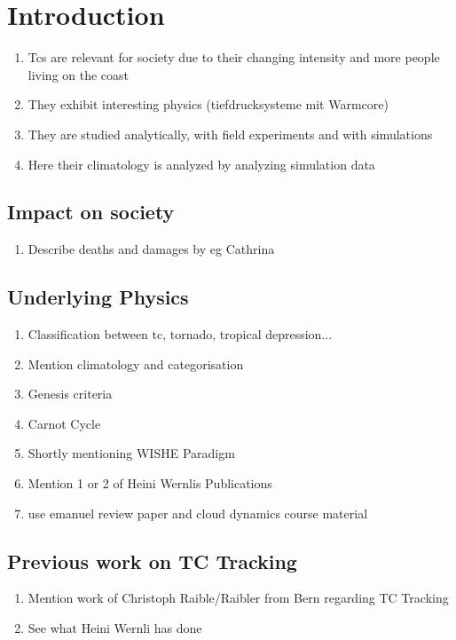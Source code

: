 \chapter{Introduction}\label{sec:introduction}
\begin{enumerate}
\item Tcs are relevant for society due to their changing intensity and more people living on the coast
\item They exhibit interesting physics (tiefdrucksysteme mit Warmcore)
\item They are studied analytically, with field experiments and with simulations
\item Here their climatology is analyzed by analyzing simulation data
\end{enumerate}
\section{Impact on society}\label{sec:society}
\begin{enumerate}
\item Describe deaths and damages by eg Cathrina
\end{enumerate}

\section{Underlying Physics}\label{sec:physics}
\begin{enumerate}
\item Classification between tc, tornado, tropical depression...
\item Mention climatology and categorisation
\item Genesis criteria
\item Carnot Cycle
\item Shortly mentioning WISHE Paradigm
\item Mention 1 or 2 of Heini Wernlis Publications
\item use emanuel review paper and cloud dynamics course material
\end{enumerate}


\section{Previous work on TC Tracking}\label{sec:tracking}
\begin{enumerate}
\item Mention work of Christoph Raible/Raibler from Bern regarding TC Tracking
\item See what Heini Wernli has done
\end{enumerate}
